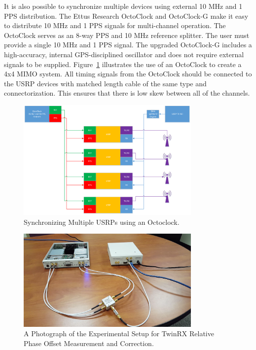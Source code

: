 \documentclass[a4paper, 11pt]{article}
\begin{document}
It is also possible to synchronize multiple devices using external 10 MHz and 1 PPS distribution. The Ettus Research OctoClock and OctoClock-G make it easy to distribute 10 MHz and 1 PPS signals for multi-channel operation. The OctoClock serves as an 8-way PPS and 10 MHz reference splitter. The user must provide a single 10 MHz and 1 PPS signal. The upgraded OctoClock-G includes a high-accuracy, internal GPS-disciplined oscillator and does not require external signals to be supplied. Figure~\ref{octoclock_sync} illustrates the use of an OctoClock to create a 4x4 MIMO system. All timing signals from the OctoClock should be connected to the USRP devices with matched length cable of the same type and connectorization. This ensures that there is low skew between all of the channels. 
\begin{figure}[t]
    \centering
    \includegraphics[width=0.8\textwidth]{figures/octoclock_mimo.pdf}
    \caption{Synchronizing Multiple USRPs using an Octoclock.}
    \label{octoclock_sync}
\end{figure}
\begin{figure}[h!]
    \centering
    \includegraphics[width=0.8\textwidth]{figures/phase_correct_image.png}
    \caption{A Photograph of the Experimental Setup for TwinRX Relative Phase Offset Measurement and Correction.}
    \label{twinrx_phase_correct_image}
\end{figure}
\end{document}
